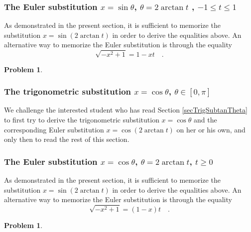 \documentclass[12pt]{book}
\newtheorem{problem}[theorem]{Problem}
\begin{document}


\subsubsection{The Euler substitution $x=\sin \theta$, $\theta=2\arctan t$ , $-1\leq t\leq 1$}





As demonstrated in the present section, it is sufficient to memorize the substitution $x=\sin (2\arctan t)$ in order to derive the equalities above. An alternative way to memorize the Euler substitution is through the equality
\[
\sqrt{-x^2+1}=1-xt\quad .
\]
\begin{problem}

\end{problem}

\subsubsection{The trigonometric substitution $x=\cos \theta$, $\theta\in\left[0, \pi\right] $}
We challenge the interested student who has read Section \ref{secTrigSubtanTheta} to first try to derive the trigonometric substitution $x=\cos \theta$ and the corresponding Euler substitution $x=\cos (2\arctan t)$  on her or his own, and only then to read the rest of this section.



\subsubsection{The Euler substitution $x=\cos \theta$, $\theta=2\arctan t$, $ t\geq 0 $}


As demonstrated in the present section, it is sufficient to memorize the substitution $x=\sin (2\arctan t)$ in order to derive the equalities above. An alternative way to memorize the Euler substitution is through the equality
\[
\sqrt{-x^2+1}=(1-x)t\quad .
\]
\begin{problem}

\end{problem}

\end{document}

